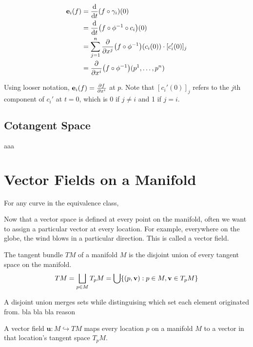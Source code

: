 \begin{align*}
	\vb{e}_{i}(f) &= \dv{t} (f \circ \gamma_{i})(0) \\
	&= \dv{t} (f \circ \phi^{-1} \circ c_{i})(0) \\
	&= \sum_{j = 1}^{n} \pdv{x^{j}} (f \circ \phi^{-1}) (c_{i}(0)) \cdot [c_{i}'(0)]_{j} \\
	&= \pdv{x^{i}} (f \circ \phi^{-1}) (p^{1}, \dots, p^{n})
\end{align*}

Using looser notation, $\vb{e}_{i}(f) = \pdv{f}{x^{i}}$ at $p$. Note that $[c_{i}'(0)]_{j}$ refers to the $j$th component of $c_{i}'$ at $t = 0$, which is 0 if $j \neq i$ and 1 if $j = i$.

\subsection{Cotangent Space}

\begin{definition}
	aaa
\end{definition}

\section{Vector Fields on a Manifold}

For any curve in the equivalence class, 

Now that a vector space is defined at every point on the manifold, often we want to assign a particular vector at every location. For example, everywhere on the globe, the wind blows in a particular direction. This is called a vector field.

\begin{definition}
	The tangent bundle $TM$ of a manifold $M$ is the disjoint union of every tangent space on the manifold.
	\begin{equation}
		TM = \bigsqcup_{p \in M} T_{p} M = \bigcup \{ (p, \vb{v}) : p \in M, \vb{v} \in T_{p} M \}
	\end{equation}
\end{definition}

A disjoint union merges sets while distinguising which set each element originated from. bla bla bla reason

\begin{definition}
	A vector field $\mathbf{u} : M \hookrightarrow TM$ maps every location $p$ on a manifold $M$ to a vector in that location's tangent space $T_{p} M$.
\end{definition}

